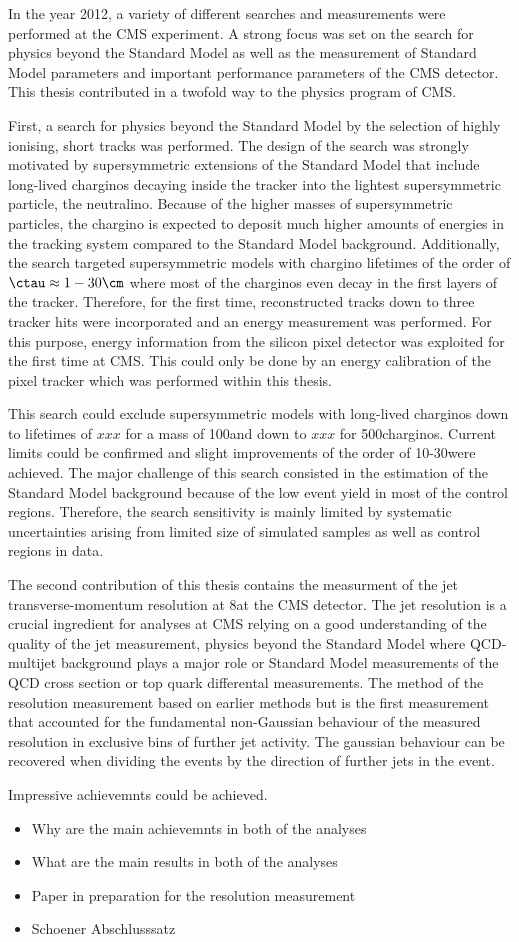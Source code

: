 In the year 2012, a variety of different searches and measurements were performed at the CMS experiment.
A strong focus was set on the search for physics beyond the Standard Model as well as the measurement of Standard Model parameters and important performance parameters of the CMS detector.
This thesis contributed in a twofold way to the physics program of CMS.

First, a search for physics beyond the Standard Model by the selection of highly ionising, short tracks was performed.
The design of the search was strongly motivated by supersymmetric extensions of the Standard Model that include long-lived charginos decaying inside the tracker into the lightest supersymmetric particle, the neutralino.
Because of the higher masses of supersymmetric particles, the chargino is expected to deposit much higher amounts of energies in the tracking system compared to the Standard Model background.
Additionally, the search targeted supersymmetric models with chargino lifetimes of the order of $\ctau \approx 1- 30\cm$ where most of the charginos even decay in the first layers of the tracker.
Therefore, for the first time, reconstructed tracks down to three tracker hits were incorporated and an energy measurement was performed.
For this purpose, energy information from the silicon pixel detector was exploited for the first time at CMS.
This could only be done by an energy calibration of the pixel tracker which was performed within this thesis.

This search could exclude supersymmetric models with long-lived charginos down to lifetimes of $xxx$ for a mass of 100\gev and down to $xxx$ for 500\gev charginos.
Current limits could be confirmed and slight improvements of the order of 10-30\gev were achieved.
The major challenge of this search consisted in the estimation of the Standard Model background because of the low event yield in most of the control regions.
Therefore, the search sensitivity is mainly limited by systematic uncertainties arising from limited size of simulated samples as well as control regions in data.


The second contribution of this thesis contains the measurment of the jet transverse-momentum resolution at 8\tev at the CMS detector.
The jet \pt resolution is a crucial ingredient for analyses at CMS relying on a good understanding of the quality of the jet \pt measurement, \eg physics beyond the Standard Model where QCD-multijet background plays a major role or Standard Model measurements of the QCD cross section or top quark differental measurements.
The method of the resolution measurement based on earlier methods but is the first measurement that accounted for the fundamental non-Gaussian behaviour of the measured resolution in exclusive bins of further jet activity.
The gaussian behaviour can be recovered when dividing the events by the direction of further jets in the event.

Impressive achievemnts could be achieved.

\begin{itemize}
\item Why are the main achievemnts in both of the analyses
\item What are the main results in both of the analyses
\item Paper in preparation for the resolution measurement
\item Schoener Abschlusssatz
\end{itemize}
